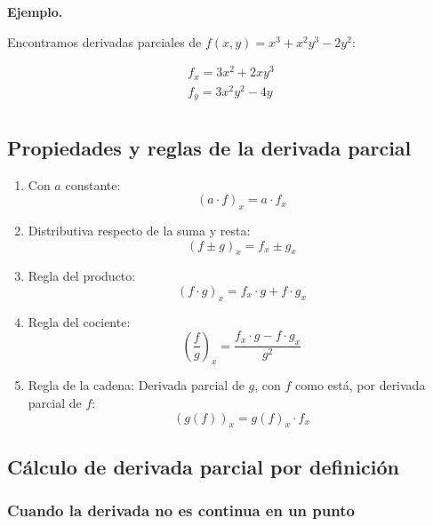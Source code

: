 \vspace{.5cm}
\textbf{Ejemplo.}

Encontramos derivadas parciales de \(f(x,y) = x^{3} + x^{2}y^{3} - 2y^{2}\):

\begin{align*}
    f_x = 3x^{2} + 2xy^{3} \\
    f_y = 3x^{2}y^{2} - 4y \\
\end{align*}

\subsection{Propiedades y reglas de la derivada parcial}

\begin{enumerate}
    \item Con \(a\) constante:
          \begin{equation*}
              (a \cdot f)_x = a\cdot f_x
          \end{equation*}
    \item Distributiva respecto de la suma y resta:
          \begin{equation*}
              (f \pm g)_x = f_x \pm g_x
          \end{equation*}
    \item Regla del producto:
          \begin{equation*}
              (f\cdot g)_x = f_x\cdot g + f\cdot g_x
          \end{equation*}
    \item Regla del cociente:
          \begin{equation*}
              \left(\frac{f}{g}\right)_x = \frac{f_x\cdot g - f\cdot g_x}{g^{2}}
          \end{equation*}
    \item Regla de la cadena:
          Derivada parcial de \(g\), con \(f\) como está,
          por derivada parcial de \(f\):
          \begin{equation*}
              (g(f))_x = g(f)_x \cdot f_x
          \end{equation*}
\end{enumerate}

\subsection{Cálculo de derivada parcial por definición}

\subsubsection{Cuando la derivada no es continua en un punto}

